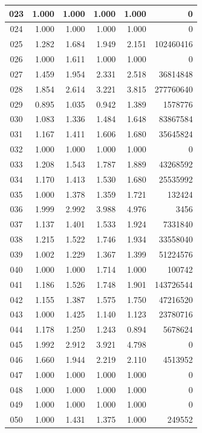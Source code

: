 \begin{longtable}{|c|r|r|r|r|r|}
\hline
023 & 1.000 & 1.000 & 1.000 & 1.000 & 0 \\
\hline
024 & 1.000 & 1.000 & 1.000 & 1.000 & 0 \\
\hline
025 & 1.282 & 1.684 & 1.949 & 2.151 & 102460416 \\
\hline
026 & 1.000 & 1.611 & 1.000 & 1.000 & 0 \\
\hline
027 & 1.459 & 1.954 & 2.331 & 2.518 & 36814848 \\
\hline
028 & 1.854 & 2.614 & 3.221 & 3.815 & 277760640 \\
\hline
029 & 0.895 & 1.035 & 0.942 & 1.389 & 1578776 \\
\hline
030 & 1.083 & 1.336 & 1.484 & 1.648 & 83867584 \\
\hline
031 & 1.167 & 1.411 & 1.606 & 1.680 & 35645824 \\
\hline
032 & 1.000 & 1.000 & 1.000 & 1.000 & 0 \\
\hline
033 & 1.208 & 1.543 & 1.787 & 1.889 & 43268592 \\
\hline
034 & 1.170 & 1.413 & 1.530 & 1.680 & 25535992 \\
\hline
035 & 1.000 & 1.378 & 1.359 & 1.721 & 132424 \\
\hline
036 & 1.999 & 2.992 & 3.988 & 4.976 & 3456 \\
\hline
037 & 1.137 & 1.401 & 1.533 & 1.924 & 7331840 \\
\hline
038 & 1.215 & 1.522 & 1.746 & 1.934 & 33558040 \\
\hline
039 & 1.002 & 1.229 & 1.367 & 1.399 & 51224576 \\
\hline
040 & 1.000 & 1.000 & 1.714 & 1.000 & 100742 \\
\hline
041 & 1.186 & 1.526 & 1.748 & 1.901 & 143726544 \\
\hline
042 & 1.155 & 1.387 & 1.575 & 1.750 & 47216520 \\
\hline
043 & 1.000 & 1.425 & 1.140 & 1.123 & 23780716 \\
\hline
044 & 1.178 & 1.250 & 1.243 & 0.894 & 5678624 \\
\hline
045 & 1.992 & 2.912 & 3.921 & 4.798 & 0 \\
\hline
046 & 1.660 & 1.944 & 2.219 & 2.110 & 4513952 \\
\hline
047 & 1.000 & 1.000 & 1.000 & 1.000 & 0 \\
\hline
048 & 1.000 & 1.000 & 1.000 & 1.000 & 0 \\
\hline
049 & 1.000 & 1.000 & 1.000 & 1.000 & 0 \\
\hline
050 & 1.000 & 1.431 & 1.375 & 1.000 & 249552 \\

\end{longtable}
